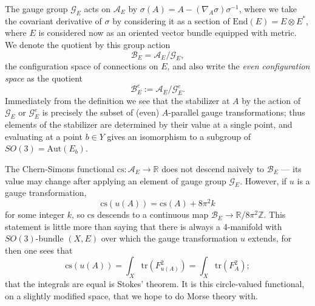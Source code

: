 \documentclass{memo-l}
\theoremstyle{definition}
\theoremstyle{remark}
\numberwithin{section}{chapter}
\numberwithin{equation}{chapter}
\begin{document}
The gauge group $\mathcal G_E$ acts on $\mathcal A_E$ by $\sigma(A) = A - (\nabla_A \sigma) \sigma^{-1}$, where we take the covariant derivative of $\sigma$ by considering it as a section of $\text{End}(E) = E \otimes E^*$, where $E$ is considered now as an oriented vector bundle equipped with metric. We denote the quotient by this group action $$\mathcal B_E = \mathcal A_E/\mathcal G_E,$$ the configuration space of connections on $E$, and also write the \textit{even configuration space} as the quotient $$\mathcal B^e_E := \mathcal A_E/\mathcal G^e_E.$$ Immediately from the definition we see that the stabilizer at $A$ by the action of $\mathcal G_E$ or $\mathcal G^e_E$ is precisely the subset of (even) $A$-parallel gauge transformations; thus elements of the stabilizer are determined by their value at a single point, and evaluating at a point $b \in Y$ gives an isomorphism to a subgroup of $SO(3) = \text{Aut}(E_b)$.

The Chern-Simons functional $\text{cs}: \mathcal A_E \to \mathbb R$ does not descend naively to $\mathcal B_E$ --- its value may change after applying an element of gauge group $\mathcal G_E$. However, if $u$ is a gauge transformation, $$\text{cs}(u(A)) = \text{cs}(A) + 8\pi^2 k$$ for some integer $k$, so $\text{cs}$ descends to a continuous map $\mathcal B_E \to \mathbb R/8\pi^2 \mathbb Z$. This statement is little more than saying that there is always a 4-manifold with $SO(3)$-bundle $(X,E)$ over which the gauge transformation $u$ extends, for then one sees that $$\text{cs}(u(A)) = \int_X \text{tr}\left(F_{u(A)}^2\right) = \int_X \text{tr}\left(F_A^2\right);$$ that the integrals are equal is Stokes' theorem. It is this circle-valued functional, on a slightly modified space, that we hope to do Morse theory with.
\end{document}
